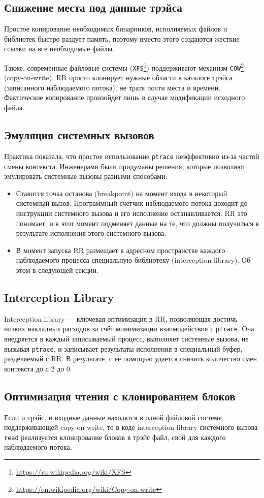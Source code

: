 \subsection{Снижение места под данные трэйса}

Простое копирование необходимых бинарников, исполняемых файлов и библиотек быстро раздует память, 
поэтому вместо этого создаются жесткие ссылки 
на все необходимые файлы.

Также, современные файловые системы (\texttt{XFS}\footnote{\url{https://ru.wikipedia.org/wiki/XFS}})
поддерживают механизм \texttt{COW}\footnote{\url{https://en.wikipedia.org/wiki/Copy-on-write}} (copy-on-write). 
RR просто клонирует нужные области в каталоге трэйса (записанного наблюдаемого потока), не тратя почти места и времени. 
Фактическое копирование произойдёт лишь в случае модификации исходного файла.

\subsection{Эмуляция системных вызовов}

Практика показала, что простое использование \texttt{ptrace} 
неэффективно из-за частой смены контекста.
Инженерами \cite{rr-paper} были придуманы решения, которые позволяют эмулировать системные вызовы разными способами:

\begin{itemize}
  \item Ставится точка останова (breakpoint) на момент входа в некоторый системный вызов. 
  Программный счетчик наблюдаемого потока доходит до инструкции системного вызова и его исполнение останавливается. 
  RR это понимает, и в этот момент подменяет данные на те, что должны получиться в результате 
  исполнения этого системного вызова.
  \item В момент запуска RR размещает в адресном пространстве каждого наблюдаемого процесса специальную библиотеку 
  (interception library). Об этом в следующей секции.
\end{itemize}

\subsection{Interception Library}

Interception library — ключевая оптимизация в RR, позволяющая достичь низких накладных расходов за счёт минимизации взаимодействия с 
\texttt{ptrace}.
Она внедряется в каждый записываемый процесс, выполняет системные вызова, не вызывая
\texttt{ptrace},
и записывает результаты исполнения в специальный буфер, разделяемый с RR.
В результате, с её помощью удается снизить количество смен контекста до с 2 до 0.

\subsection{Оптимизация чтения с клонированием блоков}

Если и трэйс, и входные данные находятся в одной файловой системе, поддерживающей copy-on-write, то в коде interception library 
системного вызова \texttt{read} реализуется клонирование блоков в трэйс файл, свой для каждого наблюдаемого потока.

